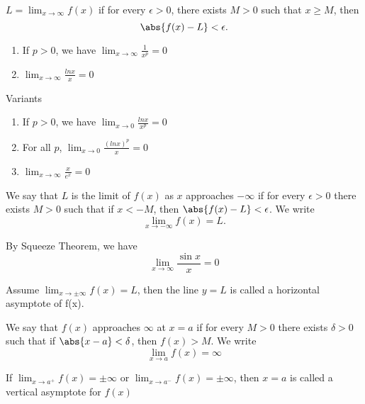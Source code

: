 
\begin{defn}
$L = \lim_{x\to\infty} f(x)$ if for every $\epsilon > 0$, there exists $M>0$ such that $x\geq M$, then \[\abs{f(x) - L} < \epsilon.\]
\end{defn}

\begin{exmp}
\begin{enumerate}
    \item If $p>0$, we have $\lim_{x\to\infty} \frac{1}{x^p} = 0$
    \item $\lim_{x\to\infty} \frac{lnx}{x} = 0$
\end{enumerate}
Variants
\begin{enumerate}
\item If $p>0$, we have $\lim_{x\to 0} \frac{lnx}{x^p} = 0$
\item For all $p$, $\lim_{x\to 0} \frac{(lnx)^p}{x} = 0$
\item $\lim_{x\to\infty} \frac{x}{e^x} = 0$
\end{enumerate}
\end{exmp}

\begin{defn}
We say that $L$ is the limit of $f(x)$ as $x$ approaches $-\infty$ if for every $\epsilon > 0$ there exists $M>0$ such that if $x < - M$, then $\abs{f(x) - L} < \epsilon$. We write \[\lim_{x\to -\infty} f(x) = L.\]
\end{defn}

\begin{exmp} By Squeeze Theorem, we have
\[\lim_{x\to\infty} \frac{\sin x }{x} = 0\]
\end{exmp}


\begin{defn}[Asymptote]
Assume $\lim_{x\to\pm\infty} f(x) = L$, then the line $y=L$ is called a horizontal asymptote of f(x).
\end{defn}

\begin{center}
\end{center}


\begin{defn}
    We say that $f(x)$ approaches $\infty$ at $x=a$ if for every $M>0$ there exists $\delta >0$ such that if $\abs{x-a}<\delta$, then $f(x) > M$. We write \[\lim_{x\to a}f(x) = \infty \]
\end{defn}

\begin{defn}
    If $\lim_{x\to a^+} f(x) = \pm\infty$ or $\lim_{x\to a^-} f(x) = \pm\infty$, then $x=a$ is called a vertical asymptote for $f(x)$
\end{defn}
